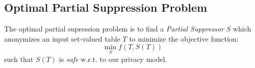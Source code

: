 
\subsection{Optimal Partial Suppression Problem}
The optimal partial supression problem is to find a {\em Partial Suppressor} $S$
which anonymizes an input set-valued table $T$ to minimize
the objective function:
\[\min_S f(T, S(T))\]
such that $S(T)$ is {\em safe} w.r.t. to our privacy model.


